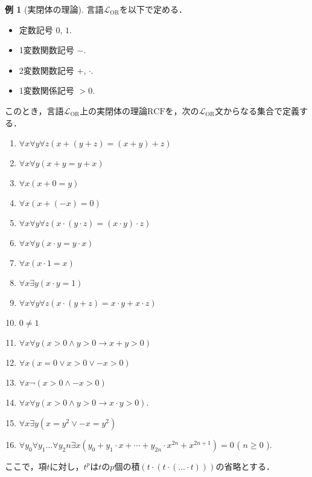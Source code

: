 \documentclass[uplatex, dvipdfmx]{jsarticle}
\numberwithin{equation}{section}
\newcommand{\RCF}{\mathrm{RCF}}
\theoremstyle{definition}
\newtheorem{example}[definition]{例}
\begin{document}
\begin{example}[実閉体の理論]
     言語$\mathcal{L}_\mathrm{OR}$を以下で定める．
     \begin{itemize}
          \item 定数記号 $0$, $1$.
          \item 1変数関数記号 $-$.
          \item 2変数関数記号 $+$, $\cdot$.
          \item 1変数関係記号 $>0$.
     \end{itemize}
     このとき，言語$\mathcal{L}_\mathrm{OR}$上の実閉体の理論$\RCF$を，次の$\mathcal{L}_\mathrm{OR}$文からなる集合で定義する．

          \begin{enumerate}
               \item $\forall x \forall y \forall z(x + (y + z) = (x + y) + z)$
               \item $\forall x \forall y (x + y = y + x)$
               \item $\forall x (x + 0 = y)$
               \item $\forall x (x + (-x) = 0)$
               \item $\forall x \forall y \forall z(x \cdot (y \cdot z) = (x \cdot y)\cdot z)$
               \item $\forall x \forall y (x \cdot y = y \cdot x)$
               \item $\forall x (x \cdot 1 = x)$
               \item $\forall x \exists y (x \cdot y = 1)$
               \item $\forall x \forall y \forall z(x \cdot (y + z) = x \cdot y + x \cdot z)$
               \item $0 \neq 1$
          \end{enumerate}
     
          \begin{enumerate}\setcounter{enumi}{10}
               \item $\forall x \forall y (x>0 \land y>0 \rightarrow x+y>0)$
               \item $\forall x (x = 0 \lor x > 0 \lor -x > 0)$
               \item $\forall x \lnot(x > 0 \land -x > 0)$
               \item $\forall x \forall y (x > 0 \land y > 0 \rightarrow x \cdot y>0)$.
          \end{enumerate}
     
          \begin{enumerate}\setcounter{enumi}{14}
               \item $\forall x \exists y (x = y^2 \lor -x = y^2)$
               \item $\forall y_0 \forall y_1 \dots \forall y_2n \exists x (y_0 + y_1 \cdot x + \cdots + y_{2n}\cdot x^{2n} + x^{2n+1}) = 0$ ( $n \geq 0$ ).
          \end{enumerate}

     ここで，項$t$に対し，$t^p$は$t$の$p$個の積$(t\cdot(t\cdot(\dots \cdot t)))$の省略とする．
\end{example}
\end{document}
